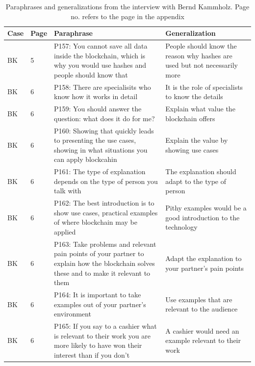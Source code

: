 \begin{table}[H]
    \centering
    \begin{tabularx}{\textwidth}{ll|X|p{4.5cm}}
	Case & Page & Paraphrase & Generalization \\ \hline
	BK & 5 & P157: You cannot save all data inside the blockchain, which is why you would use hashes and people should know that  & People should know the reason why hashes are used but not necessarily more \\  
	BK & 6 & P158: There are specialisits who know how it works in detail & It is the role of specialists to know the details \\  
	BK & 6 & P159: You should answer the question: what does it do for me? & Explain what value the blockchain offers \\  
	BK & 6 & P160: Showing that quickly leads to presenting the use cases, showing in what situations you can apply blockcahin & Explain the value by showing use cases \\  
	BK & 6 & P161: The type of explanation depends on the type of person you talk with & The explanation should adapt to the type of person \\  
	BK & 6 & P162: The best introduction is to show use cases, practical examples of where blockchain may be applied & Pithy examples would be a good introduction to the technology \\  
	BK & 6 & P163: Take problems and relevant pain points of your partner to explain how the blockchain solves these and to make it relevant to them & Adapt the explanation to your partner's pain points \\  
	BK & 6 & P164: It is important to take examples out of your partner's environment & Use examples that are relevant to the audience \\  
	BK & 6 & P165: If you say to a cashier what is relevant to their work you are more likely to have won their interest than if you don't & A cashier would need an example relevant to their work \\ 
\end{tabularx}
\caption{Paraphrases and generalizations from the interview with Bernd Kammholz. Page no. refers to the page in the appendix}
\end{table}

